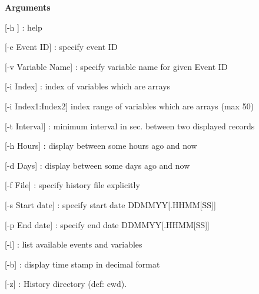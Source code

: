 \begin{DoxyItemize}
\item {\bfseries  Arguments }
\begin{DoxyItemize}
\item \mbox{[}-\/h \mbox{]} : help
\item \mbox{[}-\/e Event ID\mbox{]} : specify event ID
\item \mbox{[}-\/v Variable Name\mbox{]} : specify variable name for given Event ID
\item \mbox{[}-\/i Index\mbox{]} : index of variables which are arrays
\item \mbox{[}-\/i Index1:Index2\mbox{]} index range of variables which are arrays (max 50)
\item \mbox{[}-\/t Interval\mbox{]} : minimum interval in sec. between two displayed records
\item \mbox{[}-\/h Hours\mbox{]} : display between some hours ago and now
\item \mbox{[}-\/d Days\mbox{]} : display between some days ago and now
\item \mbox{[}-\/f File\mbox{]} : specify history file explicitly
\item \mbox{[}-\/s Start date\mbox{]} : specify start date DDMMYY\mbox{[}.HHMM\mbox{[}SS\mbox{]}\mbox{]}
\item \mbox{[}-\/p End date\mbox{]} : specify end date DDMMYY\mbox{[}.HHMM\mbox{[}SS\mbox{]}\mbox{]}
\item \mbox{[}-\/l\mbox{]} : list available events and variables
\item \mbox{[}-\/b\mbox{]} : display time stamp in decimal format
\item \mbox{[}-\/z\mbox{]} : History directory (def: cwd).
\end{DoxyItemize}
\end{DoxyItemize}



